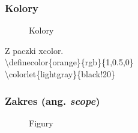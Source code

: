 \documentclass[10pt,t]{beamer}
\begin{document}
\begin{frame}
  \frametitle{Kolory}




  \begin{figure}

    \centering

    \begin{tikzpicture}









    \end{tikzpicture}


    \caption{Kolory}

  \end{figure}


  Z paczki xcolor. \\
  \textbackslash definecolor\{orange\}\{rgb\}\{1,0.5,0\} \\
  \textbackslash colorlet\{lightgray\}\{black!20\}

\end{frame}





\begin{frame}
  \frametitle{Zakres (ang. \textit{scope})}


  \begin{figure}

    \centering

    \begin{tikzpicture}






    \end{tikzpicture}


    \caption{Figury}

  \end{figure}

\end{frame}
\end{document}
